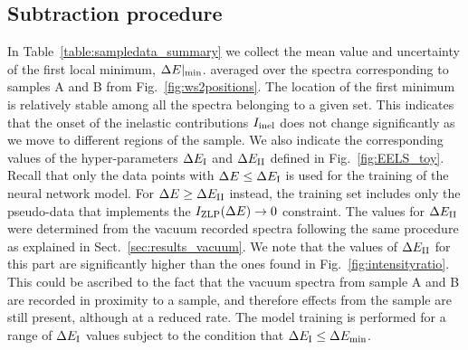 \subsection{Subtraction procedure}

In Table~\ref{table:sampledata_summary} we collect
the mean value and uncertainty of the first local minimum, $\Delta E|_{\rm min}$.
averaged over the spectra corresponding to samples A and B from
Fig.~\ref{fig:ws2positions}.
%
The location of the first minimum is relatively stable
among all the spectra belonging to a given set.
%
This indicates that the onset of the inelastic contributions $I_{\rm inel}$ does
not change significantly as we move to different regions of the sample.
%
We also indicate
the corresponding values of the hyper-parameters
$\Delta E_{\rm I}$ and $\Delta E_{\rm II}$ defined in Fig.~\ref{fig:EELS_toy}.
%
Recall that only
the data points with $\Delta E \le \Delta E_{\rm I}$ is used for the training
of the neural network model.
%
For $\Delta E \ge \Delta E_{\rm II}$ instead, the training set includes only the pseudo-data
that implements the $I_{\rm ZLP}(\Delta E)\to 0$ constraint.
The values for $\Delta E_{\rm II}$ were determined from the vacuum recorded spectra
following the same procedure as explained 
in Sect.~\ref{sec:results_vacuum}.
%
We note that the values of $\Delta E_{\rm II}$ for this part are significantly higher than
the ones found in Fig.~\ref{fig:intensityratio}. This could be ascribed to the fact that 
the vacuum spectra from sample A and B are recorded in proximity to a sample, and therefore
effects from the sample are still present, although at a reduced rate.
The model training is performed for a range of $\Delta E_{\rm I}$ values
subject to the condition that $\Delta E_{\rm I} \le \Delta E_{\rm min}$.


